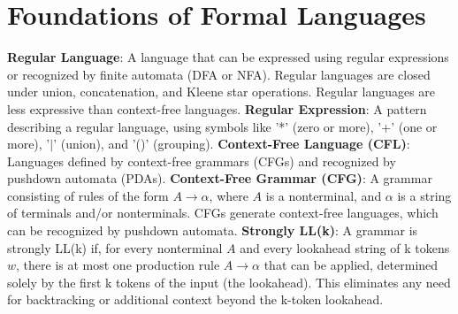 \section{Foundations of Formal Languages}
\textbf{Regular Language}: A language that can be expressed using regular expressions or recognized by finite automata (DFA or NFA). Regular languages are closed under union, concatenation, and Kleene star operations.  Regular languages are less expressive than context-free languages.
\textbf{Regular Expression}: A pattern describing a regular language, using symbols like '*' (zero or more), '+' (one or more), '$\vert$' (union), and '()' (grouping).
\textbf{Context-Free Language (CFL)}: Languages defined by context-free grammars (CFGs) and recognized by pushdown automata (PDAs).
\textbf{Context-Free Grammar (CFG)}: A grammar consisting of rules of the form $A \rightarrow \alpha $, where $A$ is a nonterminal, and $\alpha $ is a string of terminals and/or nonterminals. CFGs generate context-free languages, which can be recognized by pushdown automata.
\textbf{Strongly LL(k)}: A grammar is strongly LL(k) if, for every nonterminal $ A $ and every lookahead string of k tokens $ w $, there is at most one production rule $ A \to \alpha $ that can be applied, determined solely by the first k tokens of the input (the lookahead). This eliminates any need for backtracking or additional context beyond the k-token lookahead.